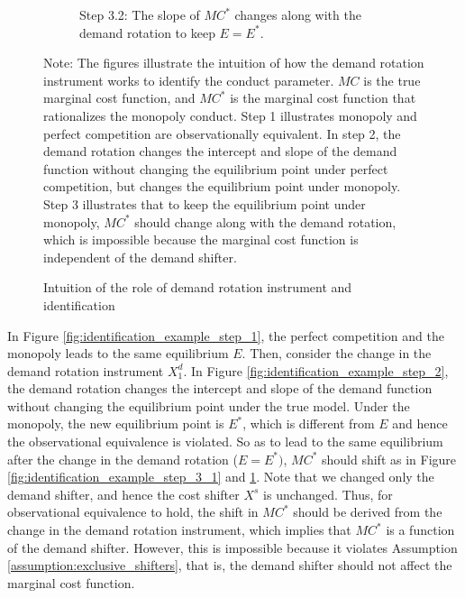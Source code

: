 \documentclass[11pt, a4paper]{article}
\theoremstyle{remark}
\begin{document}
\begin{figure}[p!]
\begin{center}
\begin{subfigure}[b]{0.45\textwidth}
            \caption{Step 3.2: The slope of $MC^{*}$ changes along with the demand rotation to keep $E = E^{*}$.}
            \label{fig:identification_example_step_3_2}
        \end{subfigure}
    \end{center}
    \caption{Intuition of the role of demand rotation instrument and identification}
    \label{fig:identification_example}
    \vspace{2mm}
    \footnotesize
    Note: The figures illustrate the intuition of how the demand rotation instrument works to identify the conduct parameter.
    $MC$ is the true marginal cost function, and $MC^{*}$ is the marginal cost function that rationalizes the monopoly conduct.
    Step 1 illustrates monopoly and perfect competition are observationally equivalent.
    In step 2, the demand rotation changes the intercept and slope of the demand function without changing the equilibrium point under perfect competition, but changes the equilibrium point under monopoly.
    Step 3 illustrates that to keep the equilibrium point under monopoly, $MC^{*}$ should change along with the demand rotation, which is impossible because the marginal cost function is independent of the demand shifter.
\end{figure}

In Figure \ref{fig:identification_example_step_1}, the perfect competition and the monopoly leads to the same equilibrium $E$.
Then, consider the change in the demand rotation instrument $X^{d}_1$.
In Figure \ref{fig:identification_example_step_2}, the demand rotation changes the intercept and slope of the demand function without changing the equilibrium point under the true model.
Under the monopoly, the new equilibrium point is $E^{*}$, which is different from $E$ and hence the observational equivalence is violated.
So as to lead to the same equilibrium after the change in the demand rotation ($E = E^{*})$, $MC^{*}$ should shift as in Figure \ref{fig:identification_example_step_3_1} and \ref{fig:identification_example_step_3_2}.
Note that we changed only the demand shifter, and hence the cost shifter $X^{s}$ is unchanged.
Thus, for observational equivalence to hold, the shift in $MC^{*}$ should be derived from the change in the demand rotation instrument, which implies that $MC^{*}$ is a function of the demand shifter.
However, this is impossible because it violates Assumption \ref{assumption:exclusive_shifters}, that is, the demand shifter should not affect the marginal cost function.
\end{document}
